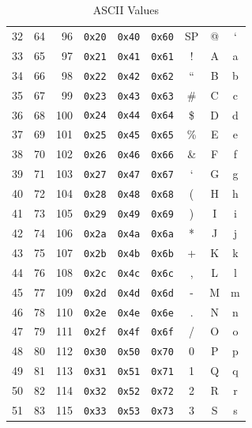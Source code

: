 \documentclass[12pt]{article}
\begin{document}
	\begin{table}[H]
	\begin{minipage}{.55\linewidth}
	\centering
	\caption{ASCII Values \label{tab:ASCII}}
	\begin{tabular}{rrr | rrr | ccc}
	\hline
	32 & 64 & 96	& \texttt{0x20} & \texttt{0x40} & \texttt{0x60}	& SP		& @	& `\\
	33 & 65 & 97	& \texttt{0x21} & \texttt{0x41} & \texttt{0x61}	& ! 		& A 	& a\\
	34 & 66 & 98	& \texttt{0x22} & \texttt{0x42} & \texttt{0x62}	& ``		& B 	& b\\
	35 & 67 & 99	& \texttt{0x23} & \texttt{0x43} & \texttt{0x63}	& \#		& C 	& c\\
	36 & 68 & 100	& \texttt{0x24} & \texttt{0x44} & \texttt{0x64}	& \$		& D 	& d\\
	37 & 69 & 101	& \texttt{0x25} & \texttt{0x45} & \texttt{0x65}	& \%		& E 	& e\\
	38 & 70 & 102	& \texttt{0x26} & \texttt{0x46} & \texttt{0x66} 	& \&		& F 	& f\\
	39 & 71 & 103	& \texttt{0x27} & \texttt{0x47} & \texttt{0x67}	& `		& G 	& g\\
	40 & 72 & 104	& \texttt{0x28} & \texttt{0x48} & \texttt{0x68}	& (		& H 	& h\\
	41 & 73 & 105 	& \texttt{0x29} & \texttt{0x49} & \texttt{0x69} 	& )		& I 	& i\\
	42 & 74 & 106	& \texttt{0x2a} & \texttt{0x4a} & \texttt{0x6a}	& *		& J	& j\\
	43 & 75 & 107	& \texttt{0x2b} & \texttt{0x4b} & \texttt{0x6b} 	& +		& K	& k\\
	44 & 76 & 108	& \texttt{0x2c} & \texttt{0x4c} & \texttt{0x6c}	& ,		& L 	& l\\
	45 & 77 & 109	& \texttt{0x2d} & \texttt{0x4d} & \texttt{0x6d}	& - 		& M 	& m\\
	46 & 78 & 110	& \texttt{0x2e} & \texttt{0x4e} & \texttt{0x6e}	& .		& N 	& n\\
	47 & 79 & 111	& \texttt{0x2f} & \texttt{0x4f} & \texttt{0x6f}	& /		& O	& o\\
	48 & 80 & 112	& \texttt{0x30} & \texttt{0x50} & \texttt{0x70}	& 0		& P 	& p\\
	49 & 81 & 113	& \texttt{0x31} & \texttt{0x51} & \texttt{0x71}	& 1		& Q 	& q\\
	50 & 82 & 114	& \texttt{0x32} & \texttt{0x52} & \texttt{0x72}	& 2		& R 	& r\\
	51 & 83 & 115	& \texttt{0x33} & \texttt{0x53} & \texttt{0x73}	& 3		& S 	& s\\

\end{tabular}
\end{minipage}
\end{table}
\end{document}
